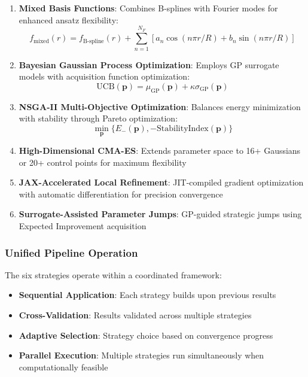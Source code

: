 \documentclass[11pt]{article}
\begin{document}
\begin{enumerate}
\item \textbf{Mixed Basis Functions}: Combines B-splines with Fourier modes for enhanced ansatz flexibility:
\begin{equation}
f_{\text{mixed}}(r) = f_{\text{B-spline}}(r) + \sum_{n=1}^{N_F} [a_n \cos(n\pi r/R) + b_n \sin(n\pi r/R)]
\end{equation}

\item \textbf{Bayesian Gaussian Process Optimization}: Employs GP surrogate models with acquisition function optimization:
\begin{equation}
\text{UCB}(\mathbf{p}) = \mu_{\text{GP}}(\mathbf{p}) + \kappa \sigma_{\text{GP}}(\mathbf{p})
\end{equation}

\item \textbf{NSGA-II Multi-Objective Optimization}: Balances energy minimization with stability through Pareto optimization:
\begin{equation}
\min_{\mathbf{p}} \{E_-(\mathbf{p}), -\text{StabilityIndex}(\mathbf{p})\}
\end{equation}

\item \textbf{High-Dimensional CMA-ES}: Extends parameter space to 16+ Gaussians or 20+ control points for maximum flexibility

\item \textbf{JAX-Accelerated Local Refinement}: JIT-compiled gradient optimization with automatic differentiation for precision convergence

\item \textbf{Surrogate-Assisted Parameter Jumps}: GP-guided strategic jumps using Expected Improvement acquisition
\end{enumerate}

\subsubsection{Unified Pipeline Operation}

The six strategies operate within a coordinated framework:
\begin{itemize}
\item \textbf{Sequential Application}: Each strategy builds upon previous results
\item \textbf{Cross-Validation}: Results validated across multiple strategies  
\item \textbf{Adaptive Selection}: Strategy choice based on convergence progress
\item \textbf{Parallel Execution}: Multiple strategies run simultaneously when computationally feasible
\end{itemize}
\end{document}
